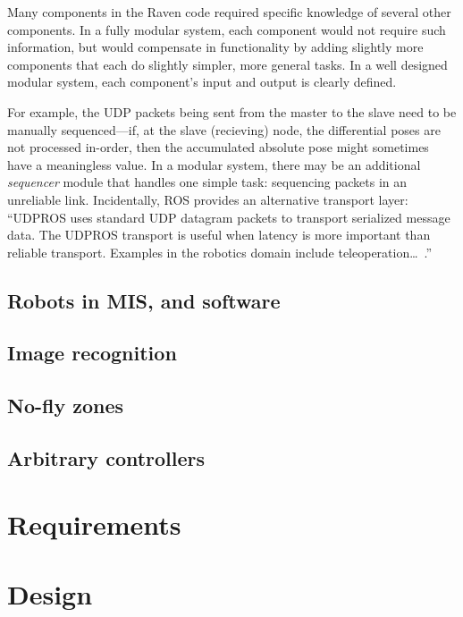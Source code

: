 \documentclass[letterpaper,twocolumn,10pt]{article}
\begin{document}
Many components in the Raven code required specific knowledge of
several other components. In a fully modular system, each component
would not require such information, but would compensate in
functionality by adding slightly more components that each do slightly
simpler, more general tasks. In a well designed modular system, each
component's input and output is clearly defined.

For example, the UDP packets being sent from the master to the slave
need to be manually sequenced---if, at the slave (recieving) node, the
differential poses are not processed in-order, then the accumulated
absolute pose might sometimes have a meaningless value. In a modular
system, there may be an additional \emph{sequencer} module that
handles one simple task: sequencing packets in an unreliable
link. Incidentally, ROS provides an alternative transport layer:
``UDPROS uses standard UDP datagram packets to transport serialized
message data. The UDPROS transport is useful when latency is more
important than reliable transport. Examples in the robotics domain
include teleoperation\ldots~\cite{udpros}.''

\subsection{Robots in MIS, and software}

\subsection{Image recognition}

\subsection{No-fly zones}

\subsection{Arbitrary controllers}

\section{Requirements}

\section{Design}
\end{document}
